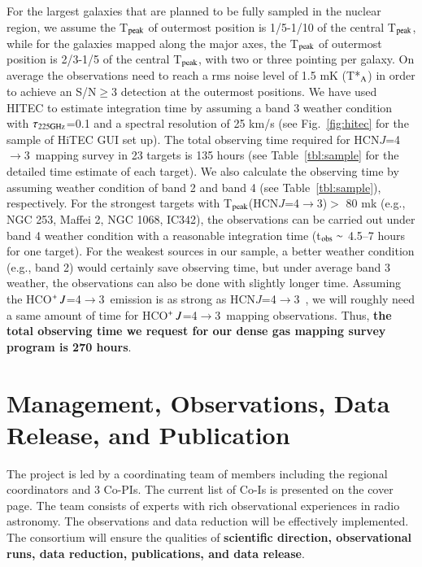 \documentclass[legal,11pt]{article}
\def\,{\thinspace}
\def\HCNft        {HCN\,$J$=4$\rightarrow$3}
\def\HCOPft     {HCO$^+\,J$=4$\rightarrow$3}
\begin{document}
For the largest galaxies that are planned to be fully sampled in the nuclear
region, we assume the T$_{\rm peak}$ of outermost position is 1/5-1/10 of the
central T$_{\rm peak}$, while for the galaxies mapped along the major axes, the
T$_{\rm peak}$ of outermost position is 2/3-1/5 of the central T$_{\rm peak}$,
with two or three pointing per galaxy.  On average the observations need to
reach a rms noise level of 1.5 mK (T*$_{\rm A}$) in order to achieve an
S/N$\geq$3 detection at the outermost positions. We have used HITEC to estimate
integration time by assuming a band 3 weather condition with $\tau_{\rm
225GHz}$=0.1 and a spectral resolution of 25 km/s (see Fig.~\ref{fig:hitec} for
the sample of HiTEC GUI set up). The total observing time required for \HCNft\
mapping survey in 23 targets is 135 hours (see Table~\ref{tbl:sample} for the
detailed time estimate of each target).  We also calculate the observing time
by assuming weather condition of band 2 and band 4 (see
Table~\ref{tbl:sample}), respectively. For the strongest targets with T$_{\rm
peak}$(\HCNft)$>$ 80 mk (e.g., NGC 253, Maffei 2, NGC 1068, IC342),  the
observations can be carried out under band 4 weather condition with a
reasonable integration time (t$_{\rm obs}\sim$ 4.5--7 hours for one target).
For the weakest sources in our sample, a better weather condition (e.g., band
2) would certainly save observing time, but under average band 3 weather, the
observations can also be done with slightly longer time.  Assuming the \HCOPft\
emission is as strong as \HCNft\ \citep[see][]{zgh2014}, we will roughly need a
same amount of time for \HCOPft\ mapping observations.  Thus, {\bf the total
observing time we request for our dense gas mapping survey program is
270 hours}.



\section{Management, Observations, Data Release, and Publication } 


The project is led by a coordinating team of members including the regional coordinators
and 3 Co-PIs. The current list of Co-Is is
presented on the cover page. The team consists of experts with rich
observational experiences in radio astronomy.  The observations and data
reduction will be effectively implemented.  The consortium will ensure the
qualities of {\bf scientific direction, observational runs, data reduction,
publications, and data release}. 
\end{document}
